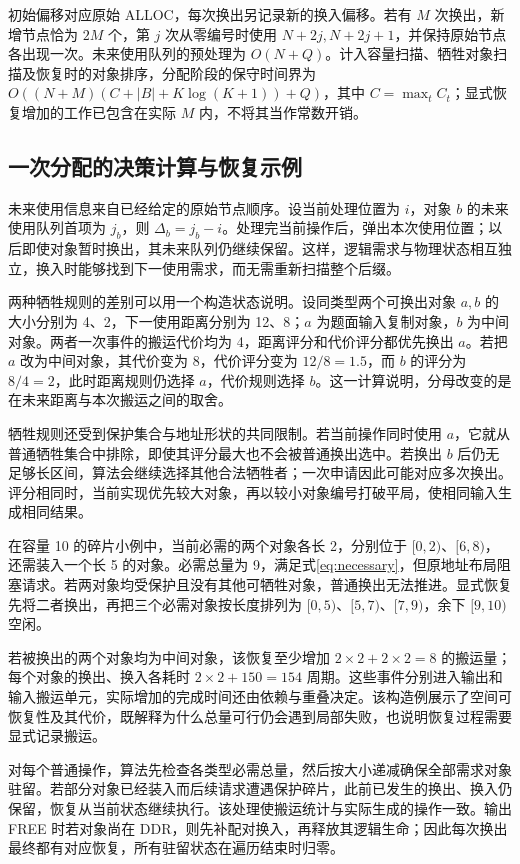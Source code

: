 初始偏移对应原始 ALLOC，每次换出另记录新的换入偏移。若有 $M$ 次换出，新增节点恰为 $2M$ 个，第 $j$ 次从零编号时使用 $N+2j,N+2j+1$，并保持原始节点各出现一次。未来使用队列的预处理为 $O(N+Q)$。计入容量扫描、牺牲对象扫描及恢复时的对象排序，分配阶段的保守时间界为 $O((N+M)(C+|B|+K\log(K+1))+Q)$，其中 $C=\max_tC_t$；显式恢复增加的工作已包含在实际 $M$ 内，不将其当作常数开销。

\subsection{一次分配的决策计算与恢复示例}
未来使用信息来自已经给定的原始节点顺序。设当前处理位置为 $i$，对象 $b$ 的未来使用队列首项为 $j_b$，则 $\Delta_b=j_b-i$。处理完当前操作后，弹出本次使用位置；以后即使对象暂时换出，其未来队列仍继续保留。这样，逻辑需求与物理状态相互独立，换入时能够找到下一使用需求，而无需重新扫描整个后缀。

两种牺牲规则的差别可以用一个构造状态说明。设同类型两个可换出对象 $a,b$ 的大小分别为 4、2，下一使用距离分别为 12、8；$a$ 为题面输入复制对象，$b$ 为中间对象。两者一次事件的搬运代价均为 4，距离评分和代价评分都优先换出 $a$。若把 $a$ 改为中间对象，其代价变为 8，代价评分变为 $12/8=1.5$，而 $b$ 的评分为 $8/4=2$，此时距离规则仍选择 $a$，代价规则选择 $b$。这一计算说明，分母改变的是在未来距离与本次搬运之间的取舍。

牺牲规则还受到保护集合与地址形状的共同限制。若当前操作同时使用 $a$，它就从普通牺牲集合中排除，即使其评分最大也不会被普通换出选中。若换出 $b$ 后仍无足够长区间，算法会继续选择其他合法牺牲者；一次申请因此可能对应多次换出。评分相同时，当前实现优先较大对象，再以较小对象编号打破平局，使相同输入生成相同结果。

在容量 10 的碎片小例中，当前必需的两个对象各长 2，分别位于 $[0,2)$、$[6,8)$，还需装入一个长 5 的对象。必需总量为 9，满足式\eqref{eq:necessary}，但原地址布局阻塞请求。若两对象均受保护且没有其他可牺牲对象，普通换出无法推进。显式恢复先将二者换出，再把三个必需对象按长度排列为 $[0,5)$、$[5,7)$、$[7,9)$，余下 $[9,10)$ 空闲。

若被换出的两个对象均为中间对象，该恢复至少增加 $2\times2+2\times2=8$ 的搬运量；每个对象的换出、换入各耗时 $2\times2+150=154$ 周期。这些事件分别进入输出和输入搬运单元，实际增加的完成时间还由依赖与重叠决定。该构造例展示了空间可恢复性及其代价，既解释为什么总量可行仍会遇到局部失败，也说明恢复过程需要显式记录搬运。

对每个普通操作，算法先检查各类型必需总量，然后按大小递减确保全部需求对象驻留。若部分对象已经装入而后续请求遭遇保护碎片，此前已发生的换出、换入仍保留，恢复从当前状态继续执行。该处理使搬运统计与实际生成的操作一致。输出 FREE 时若对象尚在 DDR，则先补配对换入，再释放其逻辑生命；因此每次换出最终都有对应恢复，所有驻留状态在遍历结束时归零。

